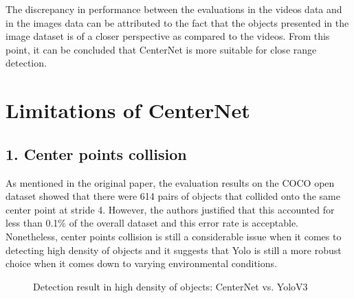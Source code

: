 \documentclass[12pt]{article}
\begin{document}
The discrepancy in performance between the evaluations in the videos data and in the images data can be attributed to the fact that the objects presented in the image dataset is of a closer perspective as compared to the videos. From this point, it can be concluded that CenterNet is more suitable for close range detection.

\section*{Limitations of CenterNet}
\subsection*{1. Center points collision}
As mentioned in the original paper, the evaluation results on the COCO open dataset showed that there were 614 pairs of objects that collided onto the same center point at stride 4. However, the authors justified that this accounted for less than 0.1\% of the overall dataset and this error rate is acceptable. Nonetheless, center points collision is still a considerable issue when it comes to detecting high density of objects and it suggests that Yolo is still a more robust choice when it comes down to varying environmental conditions.

\begin{figure}[H]%
    \centering
    \qquad
    \caption{Detection result in high density of objects: CenterNet vs. YoloV3}%
    \label{fig:example}%
\end{figure}
\end{document}

